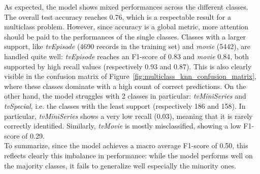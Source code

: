 As expected, the model shows mixed performances across the different classes. 
The overall test accuracy reaches 0.76, which is a respectable result for a multiclass problem. 
However, since accuracy is a global metric, more attention should be paid to the performances of the single classes. 
Classes with a larger support, like \textit{tvEpisode} (4690 records in the training set) and \textit{movie} (5442), are handled quite well: \textit{tvEpisode} reaches an F1-score of 0.83 and \textit{movie} 0.84, both supported by high recall values (respectively 0.93 and 0.87). 
This is also clearly visible in the confusion matrix of Figure~\ref{fig:multiclass_knn_confusion_matrix}, where these classes dominate with a high count of correct predictions. 
On the other hand, the model struggles with 2 classes in particular: \textit{tvMiniSeries} and \textit{tvSpecial}, i.e. the classes with the least support (respectively 186 and 158). 
In particular, \textit{tvMiniSeries} shows a very low recall (0.03), meaning that it is rarely correctly identified. 
Similarly, \textit{tvMovie} is mostly misclassified, showing a low F1-score of 0.29.\\

To summarize, since the model achieves a macro average F1-score of 0.50, this reflects clearly this imbalance in performance: while the model performs well on the majority classes, it fails to generalize well especially the minority ones.




